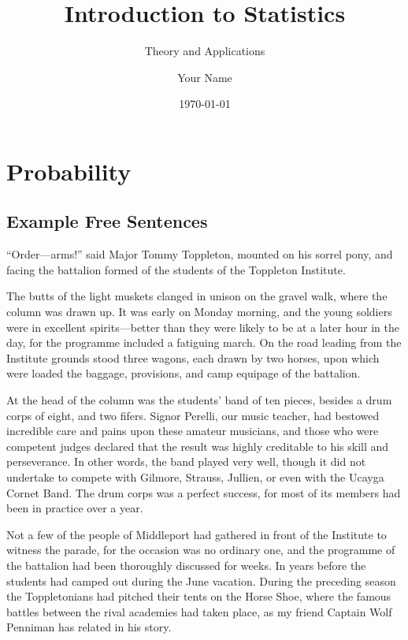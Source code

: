\documentclass[10pt,a4paper]{book}
\title{Introduction to Statistics}
\subtitle{Theory and Applications}
\author{Your Name}
\date{\today}
\begin{document}
\maketitle
\tableofcontents

\chapter{Probability}

\section{Example Free Sentences}

“Order—arms!” said Major Tommy Toppleton, mounted on his sorrel pony, and facing the battalion formed of the students of the Toppleton Institute.

The butts of the light muskets clanged in unison on the gravel walk, where the column was drawn up. It was early on Monday morning, and the young soldiers were in excellent spirits—better than they were likely to be at a later hour in the day, for the programme included a fatiguing march. On the road leading from the Institute grounds stood three wagons, each drawn by two horses, upon which were loaded the baggage, provisions, and camp equipage of the battalion.

At the head of the column was the students’ band of ten pieces, besides a drum corps of eight, and two fifers. Signor Perelli, our music teacher, had bestowed incredible care and pains upon these amateur musicians, and those who were competent judges declared that the result was highly creditable to his skill and perseverance. In other words, the band played very well, though it did not undertake to compete with Gilmore, Strauss, Jullien, or even with the Ucayga Cornet Band. The drum corps was a perfect success, for most of its members had been in practice over a year.

Not a few of the people of Middleport had gathered in front of the Institute to witness the parade, for the occasion was no ordinary one, and the programme of the battalion had been thoroughly discussed for weeks. In years before the students had camped out during the June vacation. During the preceding season the Toppletonians had pitched their tents on the Horse Shoe, where the famous battles between the rival academies had taken place, as my friend Captain Wolf Penniman has related in his story.
\end{document}
